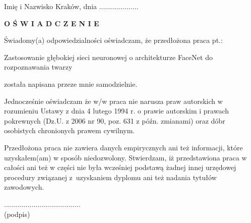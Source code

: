\newpage\thispagestyle{empty}
Imię i Nazwisko \hfill Kraków, dnia ....................\par\vspace{1cm}\par
\centerline{{\Large \bf O Ś W I A D C Z E N I E}}
\par\vspace{1.4cm}\par
Świadomy(a) odpowiedzialności oświadczam, że przedłożona praca pt.:
\begin{center}
{\sc Zastosowanie głębokiej sieci neuronowej o architekturze FaceNet
do rozpoznawania twarzy}
\end{center}
została napisana przeze mnie samodzielnie.
\par
Jednocześnie oświadczam że w/w praca nie narusza praw autorskich w rozumieniu Ustawy z dnia 4 lutego 1994 r. o prawie autorskim i prawach pokrewnych (Dz.U. z 2006 nr 90, poz.
631 z późn. zmianami) oraz dóbr osobistych chronionych prawem cywilnym.
\par
Przedłożona praca nie zawiera danych empirycznych ani też informacji, które uzyskałem(am) w sposób niedozwolony. Stwierdzam, iż przedstawiona praca w całości ani też w części nie była wcześniej podstawą żadnej innej urzędowej procedury związanej z~uzyskaniem dyplomu ani też nadania tytułów zawodowych.
\par\vspace{1cm}\par
\begin{flushright}
    ....................................... \ \ \ \ \ \ \\
    {\scriptsize (podpis)\hspace{2.3cm}\ }
\end{flushright}